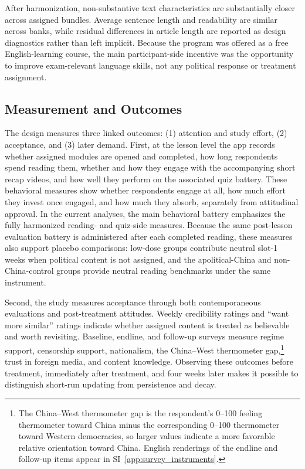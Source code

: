 \documentclass[12pt,american]{article}
\begin{document}
After harmonization, non-substantive text characteristics are substantially closer across assigned bundles. Average sentence length and readability are similar across banks, while residual differences in article length are reported as design diagnostics rather than left implicit. Because the program was offered as a free English-learning course, the main participant-side incentive was the opportunity to improve exam-relevant language skills, not any political response or treatment assignment.
	
	\subsection*{Measurement and Outcomes}
	
		The design measures three linked outcomes: (1) attention and study effort, (2) acceptance, and (3) later demand. First, at the lesson level the app records whether assigned modules are opened and completed, how long respondents spend reading them, whether and how they engage with the accompanying short recap videos, and how well they perform on the associated quiz battery. These behavioral measures show whether respondents engage at all, how much effort they invest once engaged, and how much they absorb, separately from attitudinal approval. In the current analyses, the main behavioral battery emphasizes the fully harmonized reading- and quiz-side measures. Because the same post-lesson evaluation battery is administered after each completed reading, these measures also support placebo comparisons: low-dose groups contribute neutral slot-1 weeks when political content is not assigned, and the apolitical-China and non-China-control groups provide neutral reading benchmarks under the same instrument.
	
		Second, the study measures acceptance through both contemporaneous evaluations and post-treatment attitudes. Weekly credibility ratings and ``want more similar'' ratings indicate whether assigned content is treated as believable and worth revisiting. Baseline, endline, and follow-up surveys measure regime support, censorship support, nationalism, the China--West thermometer gap,\footnote{The China--West thermometer gap is the respondent's 0--100 feeling thermometer toward China minus the corresponding 0--100 thermometer toward Western democracies, so larger values indicate a more favorable relative orientation toward China. English renderings of the endline and follow-up items appear in SI~\ref{app:survey_instruments}.} trust in foreign media, and content knowledge. Observing these outcomes before treatment, immediately after treatment, and four weeks later makes it possible to distinguish short-run updating from persistence and decay.
	
\end{document}
